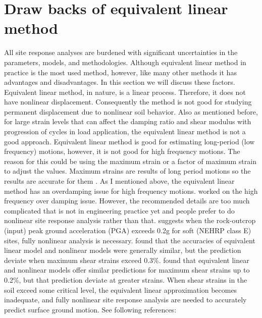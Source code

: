 
\section{Draw backs of equivalent linear method}

All site response analyses are burdened with significant uncertainties in the parameters, models, and methodologies. 
Although equivalent linear method in practice is the most used method, however, like many other methods it has advantages and disadvantages. In this section we will discuss these factors. Equivalent linear method, in nature, is a linear process. Therefore, it does not have nonlinear displacement. Consequently the method is not good for studying permanent displacement due to nonlinear soil behavior. Also as mentioned before, for large strain levels that can affect the damping ratio and shear modulus with progression of cycles in load application, the equivalent linear method is not a good approach. Equivalent linear method is good for estimating long-period (low frequency) motions, however, it is not good for high frequency motions. The reason for this could be using the maximum strain or a factor of maximum strain to adjust the values. Maximum strains are results of long period motions so the results are accurate for them \citep{Kaklamanos2013critical}. 
As I mentioned above, the equivalent linear method has an overdamping issue for high frequency motions. \citet{Sugito1994frequency,Joyner1998equivalent,Assimaki2002equivalent,Park2008rate} worked on the high frequency over damping issue. However, the recommended details are too much complicated that is not in engineering practice yet and people prefer to do nonlinear site response analysis rather than that. \citet{Assimaki2008quantifying} suggests when the rock-outcrop (input) peak ground acceleration (PGA) exceeds 0.2g for soft (NEHRP class E) sites, fully nonlinear analysis is necessary. \citet{Kim2013site} found that the accuracies of equivalent linear model and nonlinear models were generally similar, but the prediction deviate when maximum shear strains exceed 0.3\%. \citet{Yee2013elastic} found that equivalent linear and nonlinear models offer similar predictions for maximum shear strains up to 0.2\%, but that prediction deviate at greater strains. When shear strains in the soil exceed some critical level, the equivalent linear approximation becomes inadequate, and fully nonlinear site response analysis are needed to accurately predict surface ground motion. See following references: \citep{Assimaki2008quantifying,Kwok2008,Kaklamanos2013critical,Kim2013site,Yee2013elastic,Matasovic2010,Hashash2016deepsoil}\\

